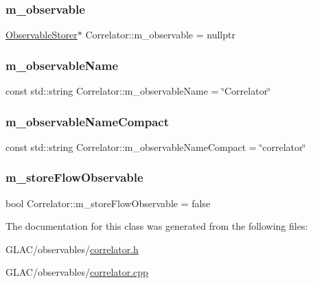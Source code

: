 \mbox{\label{class_correlator_a031c43c74c22d6b6308182228c32c5e7}} 
\subsubsection{\texorpdfstring{m\_observable}{m\_observable}}
{\footnotesize\ttfamily \mbox{\hyperlink{class_observable_storer}{Observable\+Storer}}$\ast$ Correlator\+::m\+\_\+observable = nullptr\hspace{0.3cm}{\ttfamily [protected]}}

\mbox{\label{class_correlator_abfd6599333d4ca222964ea36c7339f5c}} 
\subsubsection{\texorpdfstring{m\_observableName}{m\_observableName}}
{\footnotesize\ttfamily const std\+::string Correlator\+::m\+\_\+observable\+Name = \char`\"{}Correlator\char`\"{}\hspace{0.3cm}{\ttfamily [protected]}}

\mbox{\label{class_correlator_ad5cbec48d095ae66da43c25b6a99474f}} 
\subsubsection{\texorpdfstring{m\_observableNameCompact}{m\_observableNameCompact}}
{\footnotesize\ttfamily const std\+::string Correlator\+::m\+\_\+observable\+Name\+Compact = \char`\"{}correlator\char`\"{}\hspace{0.3cm}{\ttfamily [protected]}}

\mbox{\label{class_correlator_aac0590e0ae6e3edc790279931b06a03c}} 
\subsubsection{\texorpdfstring{m\_storeFlowObservable}{m\_storeFlowObservable}}
{\footnotesize\ttfamily bool Correlator\+::m\+\_\+store\+Flow\+Observable = false\hspace{0.3cm}{\ttfamily [protected]}}



The documentation for this class was generated from the following files\+:\begin{DoxyCompactItemize}
\item 
G\+L\+A\+C/observables/\mbox{\hyperlink{correlator_8h}{correlator.\+h}}\item 
G\+L\+A\+C/observables/\mbox{\hyperlink{correlator_8cpp}{correlator.\+cpp}}\end{DoxyCompactItemize}
